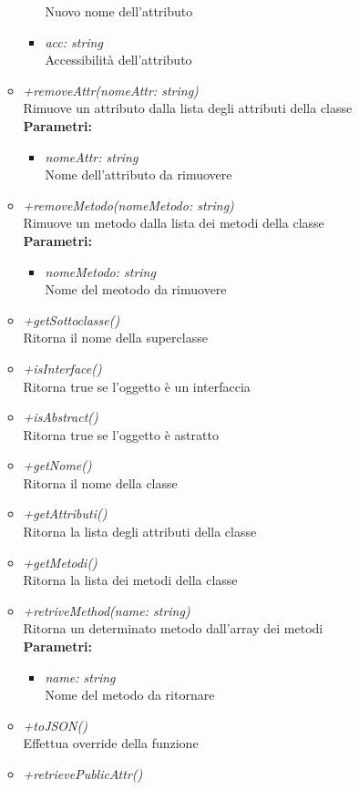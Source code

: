 \begin{itemize}
\begin{itemize}
\begin{itemize}
    			Nuovo nome dell'attributo
    			\item \emph{acc: string}\\
    			Accessibilità dell'attributo
    		\end{itemize}
    		\item \emph{+removeAttr(nomeAttr: string)}\\
    		Rimuove un attributo dalla lista degli attributi della classe\\
    		\textbf{Parametri:}
    		\begin{itemize}
    			\item \emph{nomeAttr: string}\\
    			Nome dell'attributo da rimuovere
    		\end{itemize}
    		\item \emph{+removeMetodo(nomeMetodo: string)}\\
    		Rimuove un metodo dalla lista dei metodi della classe\\
    		\textbf{Parametri:}
    		\begin{itemize}
    			\item \emph{nomeMetodo: string}\\
    			Nome del meotodo da rimuovere
    		\end{itemize}
    		\item \emph{+getSottoclasse() }\\
    		Ritorna il nome della superclasse
    		\item \emph{+isInterface()}\\
    		Ritorna true se l'oggetto è un interfaccia
    		\item \emph{+isAbstract()}\\
    		Ritorna true se l'oggetto è astratto
    		\item \emph{+getNome()}\\
    		Ritorna il nome della classe
    		\item \emph{+getAttributi()}\\
    		Ritorna la lista degli attributi della classe
    		\item \emph{+getMetodi()}\\
    		Ritorna la lista dei metodi della classe
    		\item \emph{+retriveMethod(name: string)}\\
    		Ritorna un determinato metodo dall'array dei metodi\\
    		\textbf{Parametri:}
    		\begin{itemize}
    			\item \emph{name: string}\\
    			Nome del metodo da ritornare
    		\end{itemize}
    		\item \emph{+toJSON()}\\
    		Effettua override della funzione 
    		\item \emph{+retrievePublicAttr()}\\
    		

\end{itemize}
\end{itemize}
